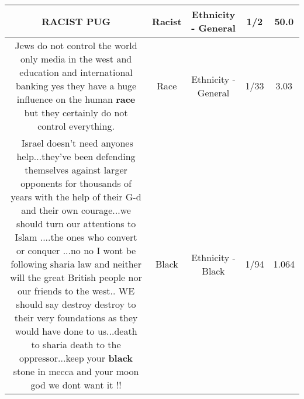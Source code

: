 \documentclass[11pt]{article}
\newlength\mylength
\begin{document}
\begin{center}
\begin{longtable}{|C{.65\mylength}|C{.30\mylength}|C{.12\mylength}|C{.12\mylength}|C{.12\mylength}|}
  \small RACIST PUG\normalsize   & Racist & Ethnicity - General & 1/2 & 50.0 \\  \hline
  \small Jews do not control the world only media in the west and education and international banking yes they have a huge influence on the human \textbf{race} but they certainly do not control everything.\normalsize   & Race & Ethnicity - General & 1/33 & 3.03 \\  \hline
  \small 🤣Israel doesn't need anyones help...they've been defending themselves against larger opponents for thousands of years with the help of their G-d and their own courage...we should turn our attentions to Islam ....the ones who convert or conquer ...no no I wont be following sharia law and neither will the great British people nor our  friends to the west.. WE should say destroy destroy to their very foundations as they would have done to us...death to sharia death to the oppressor...keep your \textbf{black} stone in mecca and your moon god we dont want it !!\normalsize   & Black & Ethnicity - Black & 1/94 & 1.064 \\  \hline

\end{longtable}
\end{center}
\end{document}
